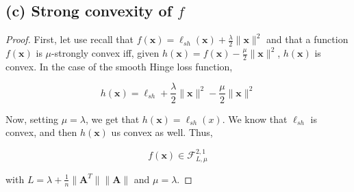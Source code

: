\documentclass[12pt]{article}
\newcommand{\xb}{\mathbf{x}}
\newcommand{\xnorm}{\lVert \mathbf{\xb} \rVert}
\newcommand{\ellsh}{\ell_{sh}}
\begin{document}
\subsection*{(c) Strong convexity of $f$}
\begin{proof}
First, let use recall that $f(\xb) = \ellsh(\xb) + \frac{\lambda}{2} \xnorm^2$ and that a function $f(\xb)$ is $\mu$-strongly convex iff, given $h(\xb) = f(\xb) - \frac{\mu}{2} \xnorm^2$, $h(\xb)$ is convex. In the case of the smooth Hinge loss function,

\begin{equation}
    h(\xb) = \ellsh + \frac{\lambda}{2} \xnorm^2 - \frac{\mu}{2} \xnorm^2
\end{equation}

Now, setting $\mu = \lambda$, we get that $h(\xb) = \ellsh(x)$. We know that $\ellsh$ is convex, and then $h(\xb)$ us convex as well. Thus,

\begin{equation}
    f(\xb) \in \mathcal{F}_{L, \mu}^{2, 1}
\end{equation}

with $L = \lambda + \frac{1}{n} \lVert \mathbf{A}^T \rVert \lVert \mathbf{A} \rVert$ and $\mu = \lambda$.

\end{proof}
\end{document}
